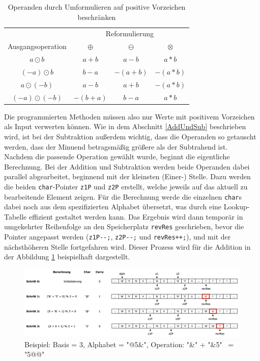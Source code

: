 \documentclass[course=erap]{aspdoc}
\begin{document}
    \begin{table}[h]
        \centering
        \begin{tabular}{cccc}
            \toprule
            & \multicolumn{3}{c}{Reformulierung} \\
            Ausgangsoperation & $\oplus$ & $\ominus$ & $\otimes$ \\
            \midrule
            $a \odot b$       & $a+b$    & $a-b$     & $a*b$     \\
            $(-a) \odot b$    & $b-a$    & $-(a+b)$  & $-(a*b)$  \\
            $a \odot (-b)$    & $a-b$    & $a+b$     & $-(a*b)$  \\
            $(-a) \odot (-b)$ & $-(b+a)$ & $b-a$     & $a*b$     \\
            \bottomrule
        \end{tabular}
        \caption{Operanden durch Umformulieren auf positive Vorzeichen beschränken}\label{tab:Umformulierung}
    \end{table}

    Die programmierten Methoden müssen also nur Werte mit positivem Vorzeichen als Input verwerten können. Wie in dem Abschnitt \ref{AddUndSub}
    beschrieben wird, ist bei der Subtraktion außerdem wichtig, dass die Operanden so getauscht werden, dass der Minuend betragsmäßig größere
    als der Subtrahend ist.\\
    \newline
    Nachdem die passende Operation gewählt wurde, beginnt die eigentliche Berechnung. Bei der Addition und Subtraktion werden beide Operanden
    dabei parallel abgearbeitet, beginnend mit der kleinsten (Einer-) Stelle. Dazu werden die beiden \verb+char+-Pointer \verb+z1P+ und
    \verb+z2P+ erstellt, welche jeweils auf das aktuell zu bearbeitende Element zeigen. Für die Berechnung werde die einzelnen \verb+char+s
    dabei noch aus dem spezifizierten Alphabet übersetzt, was durch eine Lookup-Tabelle effizient gestaltet werden kann. Das Ergebnis wird
    dann temporär in umgekehrter Reihenfolge an den Speicherplatz \verb+revRes+ geschrieben, bevor die Pointer angepasst werden (\verb+z1P--;+,
    \verb+z2P--;+ und \verb|revRes++;|), und mit der nächsthöheren Stelle fortgefahren wird. Dieser Prozess wird für die Addition in der
    Abbildung \ref{fig:ImplAdd} beispielhaft dargestellt.

    \begin{figure}[h]
        \centering
        \includegraphics[width=\textwidth]{Abbildungen/ImplementierungAddition.png}
        \caption{Beispiel: Basis = 3, Alphabet = "@5\&", Operation: "\&" + "\&5" \ = "5@@"}\label{fig:ImplAdd}
    \end{figure}
\end{document}
